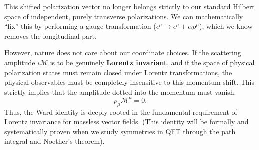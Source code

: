 This shifted polarization vector no longer belongs strictly to our standard Hilbert space of independent, purely transverse polarizations. We can mathematically ``fix'' this by performing a gauge transformation ($\epsilon^\mu \to \epsilon^\mu + \alpha p^\mu$), which we know removes the longitudinal part.

However, nature does not care about our coordinate choices. If the scattering amplitude $i\mathcal{M}$ is to be genuinely \textbf{Lorentz invariant}, and if the space of physical polarization states must remain closed under Lorentz transformations, the physical observables must be completely insensitive to this momentum shift. This strictly implies that the amplitude dotted into the momentum must vanish:
\[
    p_\mu \mathcal{M}^\mu = 0.
\]
Thus, the Ward identity is deeply rooted in the fundamental requirement of Lorentz invariance for massless vector fields. (This identity will be formally and systematically proven when we study symmetries in QFT through the path integral and Noether's theorem).